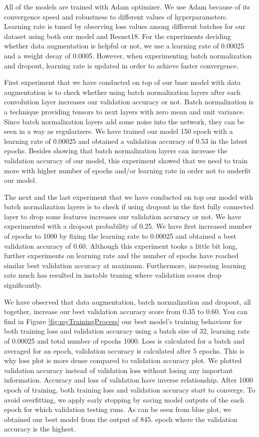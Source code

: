 \documentclass{article}
\begin{document}
All of the models are trained with Adam optimizer. We use Adam because of its convergence speed and robustness to different values of hyperparameters. Learning rate is tuned by observing loss values among different batches for our dataset using both our model and Resnet18. For the experiments deciding whether data augmentation is helpful or not, we use a learning rate of 0.00025 and a weight decay of 0.0005. However, when experimenting batch normalization and dropout, learning rate is updated in order to achieve faster convergence.

First experiment that we have conducted on top of our base model with data augmentation is to check whether using batch normalization layers after each convolution layer increases our validation accuracy or not. Batch normalization is a technique providing tensors to next layers with zero mean and unit variance. Since batch normalization layers add some noise into the network, they can be seen in a way as regularizers. We have trained our model 150 epoch with a learning rate of 0.00025 and obtained a validation accuracy of 0.53 in the latest epochs. Besides showing that batch normalization layers can increase the validation accuracy of our model, this experiment showed that we need to train more with higher number of epochs and/or learning rate in order not to underfit our model.

The next and the last experiment that we have conducted on top our model with batch normalization layers is to check if using dropout in the first fully connected layer to drop some features increases our validation accuracy or not. We have experimented with a dropout probability of 0.25. We have first increased number of epochs to 1000 by fixing the learning rate to 0.00025 and obtained  a best validation accuracy of 0.60. Although this experiment tooks a little bit long, further experiments on learning rate and the number of epochs have reached similar best validation accuracy at maximum. Furthermore, increasing learning rate much has resulted in instable traning where validation scores drop significantly.

We have observed that data augmentation, batch normalization and dropout, all together, increase our best validation accuracy score from 0.35 to 0.60. You can find in Figure \ref{fig:myTrainingProcess} our best model's training behaviour for both training loss and validation accuracy using a batch size of 32, learning rate of 0.00025 and total number of epochs 1000. Loss is calculated for a batch and averaged for an epoch, validation accuracy is calculated after 5 epochs. This is why loss plot is more dense compared to validation accuracy plot. We plotted validation accuracy instead of validation loss without losing any important information. Accuracy and loss of validation have inverse relationship. After 1000 epoch of training, both training loss and validation accuracy start to converge. To avoid overfitting, we apply early stopping by saving model outputs of the each epoch for which validation testing runs. As can be seen from blue plot, we obtained our best model from the output of 845. epoch where the validation accuracy is the highest.
\end{document}
